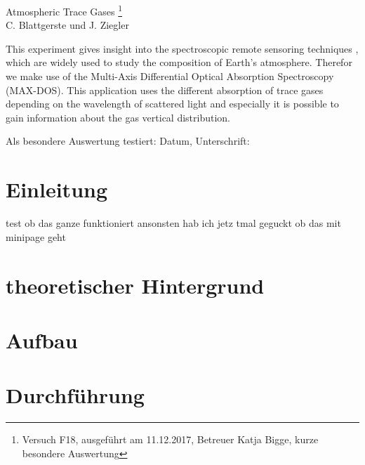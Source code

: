 \documentclass[12pt]{article}
\begin{document}
\thispagestyle{empty}
\null\vspace{40mm}
\begin{center}
{
\Large  Atmospheric Trace Gases
\footnote{\noindent Versuch F18, ausgeführt am 11.12.2017, Betreuer Katja Bigge, kurze besondere Auswertung}
}\\[15mm]

C. Blattgerste und J. Ziegler

\vspace{25mm}

\parbox{0.9\textwidth}{

\small  This experiment gives insight into the spectroscopic remote sensoring techniques
, which are widely used to study the composition of Earth's atmosphere.
Therefor we make use of the Multi-Axis Differential Optical Absorption Spectroscopy (MAX-DOS).
This application uses the different absorption of trace gases depending on the
wavelength of scattered light and especially it is possible to gain information about
the gas vertical distribution.
}
\end{center}

\vfill
Als besondere Auswertung testiert: Datum, Unterschrift:
\vspace{20mm}

\newpage
\null\thispagestyle{empty}

\newpage     %
\tableofcontents
{}
\newpage


\section{Einleitung}
  \begin{multicols}{2}
    test ob das ganze funktioniert
    ansonsten hab ich jetz tmal geguckt ob das mit minipage geht
  \end{multicols}

\section{theoretischer Hintergrund}

\section{Aufbau}

\section{Durchführung}
\end{document}
